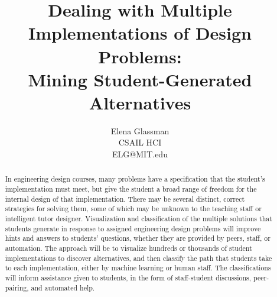 \documentclass[12pt]{article}
\begin{document}
\title{Dealing with Multiple Implementations of Design Problems: \\Mining Student-Generated Alternatives}

\author{Elena Glassman \\ CSAIL HCI \\ ELG@MIT.edu
}

\maketitle

\begin{abstract}
In engineering design courses, many problems have a specification that the student's implementation must meet, but give the student a broad range of freedom for the internal design of that implementation. There may be several distinct, correct strategies for solving them, some of which may be unknown to the teaching staff or intelligent tutor designer. Visualization and classification of the multiple solutions that students generate in response to assigned engineering design problems will improve hints and answers to students' questions, whether they are provided by peers, staff, or automation. The approach will be to visualize hundreds or thousands of student implementations to discover alternatives, and then classify the path that students take to each implementation, either by machine learning or human staff. The classifications will inform assistance given to students, in the form of staff-student discussions, peer-pairing, and automated help.%
\end{abstract}

%

%

\end{document}
